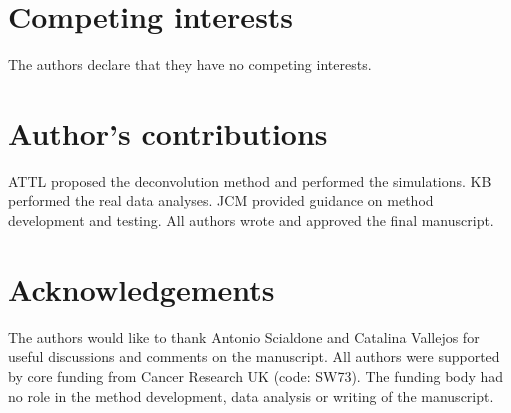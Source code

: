 \documentclass{bmcart}
\begin{document}

\begin{backmatter}

\section*{Competing interests}
The authors declare that they have no competing interests.

\section*{Author's contributions}
ATTL proposed the deconvolution method and performed the simulations.
KB performed the real data analyses.
JCM provided guidance on method development and testing.
All authors wrote and approved the final manuscript.

\section*{Acknowledgements}
The authors would like to thank Antonio Scialdone and Catalina Vallejos for useful discussions and comments on the manuscript.
All authors were supported by core funding from Cancer Research UK (code: SW73).
The funding body had no role in the method development, data analysis or writing of the manuscript.




\end{backmatter}
\end{document}
